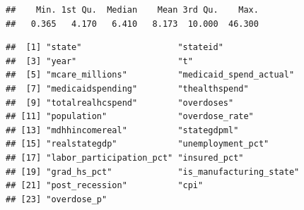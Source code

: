 \documentclass[
]{article}
\newenvironment{Shaded}{\begin{snugshade}}{\end{snugshade}}
\newcommand{\DecValTok}[1]{\textcolor[rgb]{0.00,0.00,0.81}{#1}}
\newcommand{\FunctionTok}[1]{\textcolor[rgb]{0.00,0.00,0.00}{#1}}
\newcommand{\NormalTok}[1]{#1}
\newcommand{\OtherTok}[1]{\textcolor[rgb]{0.56,0.35,0.01}{#1}}
\newcommand{\SpecialCharTok}[1]{\textcolor[rgb]{0.00,0.00,0.00}{#1}}
\begin{document}
\begin{Shaded}
\end{Shaded}

\begin{verbatim}
##    Min. 1st Qu.  Median    Mean 3rd Qu.    Max. 
##   0.365   4.170   6.410   8.173  10.000  46.300
\end{verbatim}

\begin{Shaded}
\end{Shaded}

\begin{verbatim}
##  [1] "state"                   "stateid"                
##  [3] "year"                    "t"                      
##  [5] "mcare_millions"          "medicaid_spend_actual"  
##  [7] "medicaidspending"        "thealthspend"           
##  [9] "totalrealhcspend"        "overdoses"              
## [11] "population"              "overdose_rate"          
## [13] "mdhhincomereal"          "stategdpml"             
## [15] "realstategdp"            "unemployment_pct"       
## [17] "labor_participation_pct" "insured_pct"            
## [19] "grad_hs_pct"             "is_manufacturing_state" 
## [21] "post_recession"          "cpi"                    
## [23] "overdose_p"
\end{verbatim}
\end{document}
